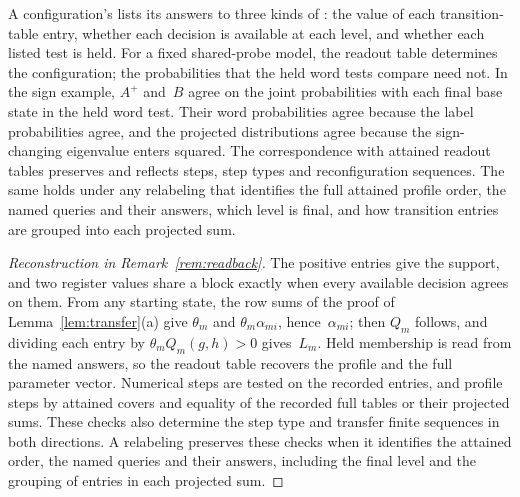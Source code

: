 \begin{remark}\label{rem:readback}
A configuration's  lists its answers to three kinds
of : the value of each transition-table entry,
whether each decision is available at each level, and whether each listed
test is held. For a fixed shared-probe model, the readout table determines
the configuration; the probabilities that the held word tests compare need
not. In the sign example, $A^+$ and~$B$ agree on the joint probabilities
with each final base state in the held word test. Their word probabilities
agree because the label probabilities agree, and the projected distributions
agree because the sign-changing eigenvalue enters squared. The
correspondence with attained readout tables preserves and reflects steps,
step types and reconfiguration sequences. %
The same holds under any relabeling that identifies the full attained
profile order, the named queries and their answers, which level is final,
and how transition entries are grouped into each projected sum.
\end{remark}

\begin{proof}[Reconstruction in Remark~\ref{rem:readback}]
The positive entries give the support, and two register values share a
block exactly when every available decision agrees on them. From any
starting state, the row sums of the proof of Lemma~\ref{lem:transfer}(a)
give $\theta_m$ and $\theta_m\alpha_{mi}$, hence~$\alpha_{mi}$; then $Q_m$
follows, and dividing each entry by $\theta_mQ_m(g,h)>0$ gives~$L_m$. Held
membership is read from the named answers, so the readout table recovers
the profile and the full parameter vector. Numerical steps are tested on the
recorded entries, and profile steps by attained covers and equality of the
recorded full tables or their projected sums. These checks also determine
the step type and transfer finite sequences in both directions. A relabeling
preserves these checks when it identifies the attained order, the named
queries and their answers, including the final level and the grouping of
entries in each projected sum.
\end{proof}

